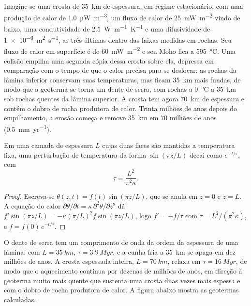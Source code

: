 Imagine-se uma crosta de \qty{35}{km} de espessura, em regime estacionário, com uma produção de calor de
\qty{1.0}{\micro W.m^{-3}}, um fluxo de calor de \qty{25}{mW.m^{-2}} vindo de baixo, uma condutividade
de \qty{2.5}{W.m^{-1}.K^{-1}} e uma difusividade de \qty{1e-6}{m^2.s^{-1}}, as três últimas
dentro das faixas medidas em rochas. Seu fluxo de calor em superfície é de \qty{60}{mW.m^{-2}} e seu Moho fica a
\qty{595}{\celsius}. Uma colisão empilha uma segunda cópia dessa crosta sobre ela, depressa
em comparação com o tempo de que o calor precisa para se deslocar: as rochas da lâmina inferior conservam suas
temperaturas, mas ficam \qty{35}{km} mais fundas, de modo que a geoterma se torna um dente de serra, com
rochas a \qty{0}{\celsius} a \qty{35}{km} sob rochas quentes da lâmina superior. A crosta tem
agora \qty{70}{km} de espessura e contém o dobro de rocha produtora de calor. Trinta milhões de anos depois
do empilhamento, a erosão começa e remove \qty{35}{km} em 70 milhões de anos
(\qty{0.5}{mm.yr^{-1}}).

\begin{proposition}\label{prop:b2:pt-paths:relaxation}
Em uma camada de espessura $L$ cujas duas faces são mantidas a temperatura fixa, uma perturbação
de temperatura da forma $\sin(\pi z/L)$ decai como $e^{-t/\tau}$, com
\[
\tau = \frac{L^2}{\pi^2\kappa}.
\]
\end{proposition}

\begin{proof}
Escreva-se $\theta(z, t) = f(t)\sin(\pi z/L)$, que se anula em $z = 0$ e $z = L$. A equação
do calor $\partial\theta/\partial t = \kappa\,\partial^2\theta/\partial z^2$ dá
$f'\sin(\pi z/L) = -\kappa(\pi/L)^2 f\sin(\pi z/L)$, logo $f' = -f/\tau$ com $\tau =
L^2/(\pi^2\kappa)$, e $f = f(0)\,e^{-t/\tau}$.
\end{proof}

O dente de serra tem um comprimento de onda da ordem da espessura de uma lâmina: com $L =
\qty{35}{km}$, $\tau = \qty{3.9}{Myr}$, e a cunha fria a \qty{35}{km} se apaga em
dez milhões de anos. A crosta espessada inteira, $L = \qty{70}{km}$, relaxa em $\tau =
\qty{16}{Myr}$, de modo que o aquecimento continua por dezenas de milhões de anos, em direção à geoterma muito
mais quente que sustenta uma crosta duas vezes mais espessa e com o dobro de rocha produtora de calor.
A figura
abaixo mostra as geotermas calculadas.

